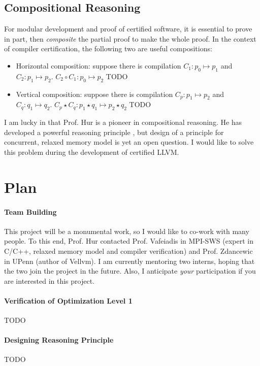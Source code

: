 \documentclass[nocopyrightspace]{sigplanconf}
\begin{document}
\subsection{Compositional Reasoning}

For modular development and proof of certified software, it is
essential to prove in part, then \emph{composite} the partial proof to
make the whole proof.  In the context of compiler certification, the
following two are useful compositions:
\begin{itemize}
\item Horizontal composition: suppose there is compilation $C_1: p_0
  \mapsto p_1$ and $C_2: p_1 \mapsto p_2$.  $C_2 \circ C_1: p_0
  \mapsto p_2$ TODO
\item Vertical composition: suppose there is compilation $C_p: p_1
  \mapsto p_2$ and $C_q: q_1 \mapsto q_2$.  $C_p \star C_q: p_1 \star
  q_1 \mapsto p_2 \star q_2$ TODO
\end{itemize}

I am lucky in that Prof. Hur is a pioneer in compositional reasoning.
He has developed a powerful reasoning principle \cite{}, but design of
a principle for concurrent, relaxed memory model is yet an open
question.  I would like to solve this problem during the development
of certified LLVM.

\section{Plan}

\paragraph{Team Building}
This project will be a monumental work, so I would like to co-work
with many people.  To this end, Prof. Hur contacted Prof. Vafeiadis in
MPI-SWS (expert in C/C++, relaxed memory model and compiler
verification) and Prof. Zdancewic in UPenn (author of Vellvm).  I am
currently mentoring two interns, hoping that the two join the project
in the future.  Also, I anticipate \emph{your} participation if you
are interested in this project.

\paragraph{Verification of Optimization Level 1}
TODO

\paragraph{Designing Reasoning Principle}
TODO






\end{document}
